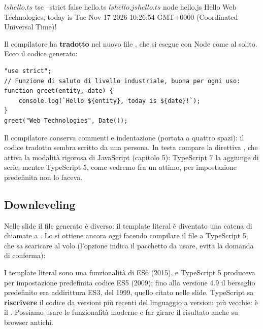 \begin{console}[Terminale]
$ ls
hello.ts
$ tsc --strict false hello.ts
$ ls
hello.js
hello.ts
$ node hello.js
Hello Web Technologies, today is Tue Nov 17 2026 10:26:54 GMT+0000 (Coordinated Universal Time)!
\end{console}

Il compilatore ha \textbf{tradotto}  nel nuovo file
, che si esegue con Node come al solito. Ecco il codice
generato:

\begin{lstlisting}[style=js, name=hello.js]
"use strict";
// Funzione di saluto di livello industriale, buona per ogni uso:
function greet(entity, date) {
    console.log(`Hello ${entity}, today is ${date}!`);
}
greet("Web Technologies", Date());
\end{lstlisting}

Il compilatore conserva commenti e indentazione (portata a quattro spazi): il
codice tradotto sembra scritto da una persona. In testa compare la direttiva
, che attiva la modalità rigorosa di JavaScript (capitolo
5): TypeScript 7 la aggiunge di serie, mentre TypeScript 5, come vedremo fra
un attimo, per impostazione predefinita non lo faceva.

\subsection{Downleveling}

Nelle slide il file generato è diverso: il template literal è diventato una
catena di chiamate a . Lo si ottiene ancora oggi facendo compilare
il file a TypeScript 5, che  sa scaricare al volo (l'opzione
 indica il pacchetto da usare,  evita la domanda di
conferma):


I template literal sono una funzionalità di ES6 (2015), e TypeScript 5 produceva
per impostazione predefinita codice ES5 (2009); fino alla versione 4.9 il
bersaglio predefinito era addirittura ES3, del 1999, quello citato nelle slide.
TypeScript sa \textbf{riscrivere} il codice da versioni più recenti del
linguaggio a versioni più vecchie: è il . Possiamo usare le
funzionalità moderne e far girare il risultato anche su browser antichi.

